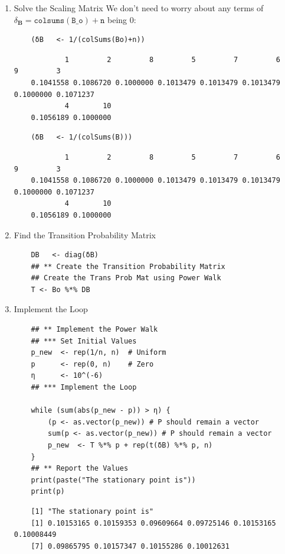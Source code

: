 \documentclass[11pt]{report}
\begin{document}
\begin{enumerate}
\item Solve the Scaling Matrix
\label{sec:org91a6dae}
We don't need to worry about any terms of \(\delta_{\mathbf{B}} = \mathtt{colsums\left(B\_o\right)+n}\) being 0:

\begin{tcolorbox}
    \begin{verbatim}
    (δB   <- 1/(colSums(Bo)+n))
    \end{verbatim}
\tcblower
    \begin{verbatim}
            1         2         8         5         7         6         9         3
    0.1041558 0.1086720 0.1000000 0.1013479 0.1013479 0.1013479 0.1000000 0.1071237
            4        10
    0.1056189 0.1000000
    \end{verbatim}
\end{tcolorbox}

\begin{tcolorbox}
    \begin{verbatim}
    (δB   <- 1/(colSums(B)))
    \end{verbatim}
\tcblower
    \begin{verbatim}
            1         2         8         5         7         6         9         3
    0.1041558 0.1086720 0.1000000 0.1013479 0.1013479 0.1013479 0.1000000 0.1071237
            4        10
    0.1056189 0.1000000
    \end{verbatim}
\end{tcolorbox}

\item Find the Transition Probability Matrix
\label{sec:org066ab51}

\begin{tcolorbox}
    \begin{verbatim}
    DB   <- diag(δB)
    ## ** Create the Transition Probability Matrix
    ## Create the Trans Prob Mat using Power Walk
    T <- Bo %*% DB
    \end{verbatim}
\end{tcolorbox}

\item Implement the Loop
\label{sec:orgbb34a45}

\begin{tcolorbox}
    \begin{verbatim}
    ## ** Implement the Power Walk
    ## *** Set Initial Values
    p_new  <- rep(1/n, n)  # Uniform
    p      <- rep(0, n)    # Zero
    η      <- 10^(-6)
    ## *** Implement the Loop

    while (sum(abs(p_new - p)) > η) {
        (p <- as.vector(p_new)) # P should remain a vector
        sum(p <- as.vector(p_new)) # P should remain a vector
        p_new  <- T %*% p + rep(t(δB) %*% p, n)
    }
    ## ** Report the Values
    print(paste("The stationary point is"))
    print(p)
    \end{verbatim}
\tcblower
    \begin{verbatim}
    [1] "The stationary point is"
    [1] 0.10153165 0.10159353 0.09609664 0.09725146 0.10153165 0.10008449
    [7] 0.09865795 0.10157347 0.10155286 0.10012631
    \end{verbatim}
\end{tcolorbox}


\end{enumerate}
\end{document}
